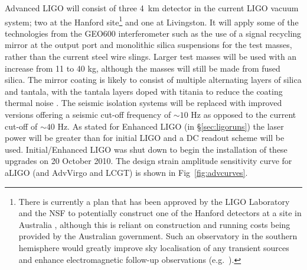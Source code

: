 \documentclass{article}
\begin{document}
Advanced LIGO will consist of three 4~km detector in the current LIGO vacuum
system; two at the Hanford site\footnote{There is currently a plan that
has been approved by the LIGO Laboratory and the NSF to potentially construct
one of the Hanford detectors at a site in Australia \cite{Marx:2010}, although
this is reliant on construction and running costs being provided by the
Australian government. Such an observatory in the southern hemisphere would
greatly improve sky localisation of any transient sources and enhance
electromagnetic follow-up observations (e.g.~\cite{Barriga:2010}).} and one at
Livingston. It will apply some of the technologies from the GEO600
interferometer such as the use of a signal recycling mirror at the output port
and monolithic silica suspensions for the test masses, rather than the current
steel wire slings. Larger test masses will be used with an increase from 11 to
40 kg, although the masses will still be made from fused silica. The mirror
coating is likely to consist of multiple alternating layers of silica and
tantala, with the tantala layers doped with titania to reduce the coating
thermal noise \cite{Agresti:2006}. The seismic isolation systems will be
replaced with improved versions offering a seismic cut-off frequency of $\sim10$
Hz as opposed to the current cut-off of $\sim40$ Hz. As stated for Enhanced LIGO
(in \S\ref{sec:ligoruns}) the laser power will be greater than for initial
LIGO and a DC readout scheme will be used. Initial/Enhanced LIGO was shut down
to begin the installation of these upgrades on 20 October 2010. The design
strain amplitude sensitivity curve for aLIGO (and AdvVirgo and LCGT) is shown
in Fig~\ref{fig:advcurves}.

\end{document}
